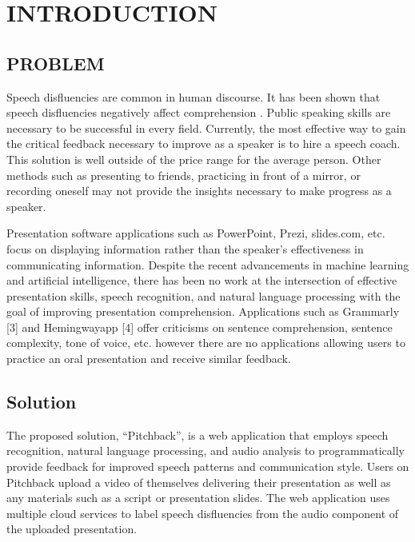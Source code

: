 \renewcommand{\thechapter}{}
\renewcommand{\chaptername}{}



\section*{INTRODUCTION} 


\subsection*{PROBLEM}

Speech disfluencies are common in human discourse. It has been shown that
speech disfluencies negatively affect comprehension \citep{corelystewart}.
Public speaking skills are necessary to be successful in every field.
Currently, the most effective way to gain the critical feedback necessary to
improve as a speaker is to hire a speech coach. This solution is well outside of
the price range for the average person. Other methods such as presenting to
friends, practicing in front of a mirror, or recording oneself may not provide
the insights necessary to make progress as a speaker.

Presentation software applications such as PowerPoint, Prezi,
slides.com, etc. focus on displaying information rather than the speaker’s
effectiveness in communicating information. Despite the recent advancements in
machine learning and artificial intelligence, there has been no work at the
intersection of effective presentation skills, speech recognition, and natural
language processing with the goal of improving presentation comprehension.
Applications such as Grammarly [3] and Hemingwayapp [4] offer criticisms on
sentence comprehension, sentence complexity, tone of voice, etc. however there
are no applications allowing users to practice an oral presentation and receive
similar feedback.


\subsection*{Solution}

The proposed solution, “Pitchback”, is a web application that employs speech
recognition, natural language processing, and audio analysis to programmatically
provide feedback for improved speech patterns and communication style. Users on
Pitchback upload a video of themselves delivering their presentation as well as
any materials such as a script or presentation slides. The web application uses
multiple cloud services to label speech disfluencies from the audio component of
the uploaded presentation. 

